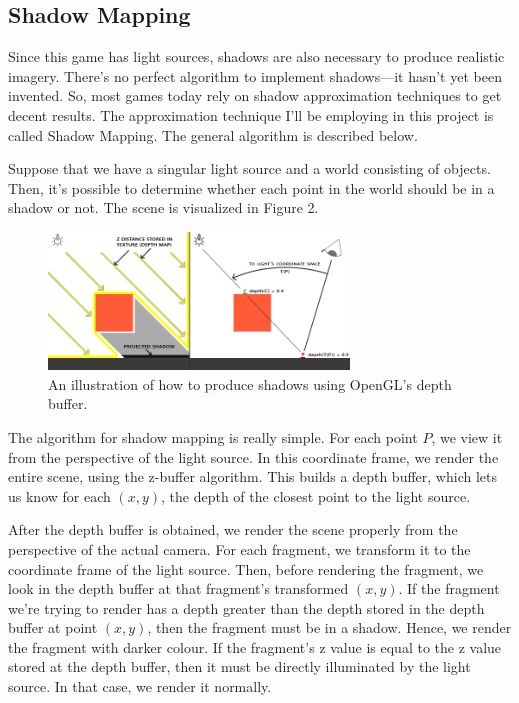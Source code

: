 \documentclass[11pt]{article}
\begin{document}
\subsection{Shadow Mapping}
Since this game has light sources, shadows are also necessary to produce realistic imagery. There's no perfect algorithm to implement shadows---it hasn't yet been invented. So, most games today rely on shadow approximation techniques to get decent results. The approximation technique I'll be employing in this project is called Shadow Mapping. The general algorithm is described below.

Suppose that we have a singular light source and a world consisting of objects. Then, it's possible to determine whether each point in the world should be in a shadow or not. The scene is visualized in Figure 2.

\begin{figure}[H]
\includegraphics[width=8cm]{shadow_mapping_theory_spaces}
\centering
\caption{An illustration of how to produce shadows using OpenGL's depth buffer\cite{shadow-map-learn-opengl}.}
\end{figure}

The algorithm for shadow mapping is really simple. For each point $P$, we view it from the perspective of the light source. In this coordinate frame, we render the entire scene, using the z-buffer algorithm. This builds a depth buffer, which lets us know for each $(x, y)$, the depth of the closest point to the light source.

After the depth buffer is obtained, we render the scene properly from the perspective of the actual camera. For each fragment, we transform it to the coordinate frame of the light source. Then, before rendering the fragment, we look in the depth buffer at that fragment's transformed $(x, y)$. If the fragment we're trying to render has a depth greater than the depth stored in the depth buffer at point $(x, y)$, then the fragment must be in a shadow. Hence, we render the fragment with darker colour. If the fragment's z value is equal to the z value stored at the depth buffer, then it must be directly illuminated by the light source. In that case, we render it normally.
\end{document}
